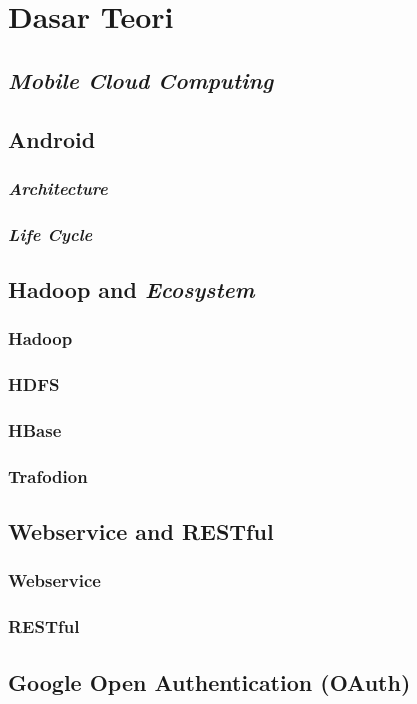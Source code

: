 \chapter{Dasar Teori}
\label{chap:dasarteori}

\section{\textit{Mobile Cloud Computing}}
\label{sec:mobilecloudcomputing}

\section{Android}
\label{sec:android}

\subsection{\textit{Architecture}}
\label{subsec:architecture}

\subsection{\textit{Life Cycle}}
\label{subsec:lifecycle}

\section{Hadoop and \textit{Ecosystem}}
\label{sec:hadoopandecosystem}

\subsection{Hadoop}
\label{subsec:hadoop}

\subsection{HDFS}
\label{subsec:hdfs}

\subsection{HBase}
\label{subsec:hbase}

\subsection{Trafodion}
\label{subsec:trafodian}

\section{Webservice and RESTful}
\label{sec:webserviceansrestful}

\subsection{Webservice}
\label{subsec:webservice}

\subsection{RESTful}
\label{subsec:restful}

\section{Google Open Authentication (OAuth)}
\label{sec:googleopenauthentication}